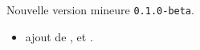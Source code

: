 Nouvelle version mineure \verb+0.1.0-beta+. 
    
\begin{itemize}[itemsep=.5em]
    \item {} ajout de ,  et .
\end{itemize}

\separation